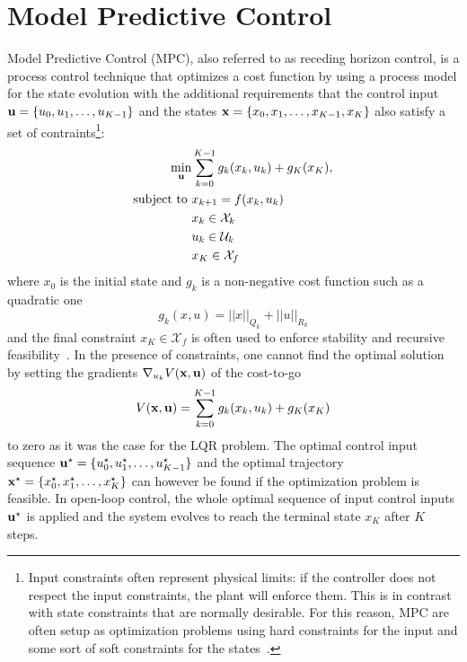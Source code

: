 \chapter{Model Predictive Control}
\label{sec:MPC}

Model Predictive Control (MPC), also referred to as receding horizon control, is a process control technique that optimizes a cost function by using a process model for the state evolution with the additional requirements that the control input $\boldsymbol{\mathrm{u}} = \{u_0,u_1,\ldots,u_{K-1}\}$ and the states $\boldsymbol{\mathrm{x}} = \{x_0,x_1,\ldots,x_{K-1},x_K\}$ also satisfy a set of contraints\footnote{Input constraints often represent physical limits: if the controller does not respect the input constraints, the plant will enforce them. This is in contrast with state constraints that are normally desirable. For this reason, MPC are often setup as optimization problems using hard constraints for the input and some sort of soft constraints for the states~\cite{MPC-diehl}.}:
\begin{equation}
  \label{eq:MPC-general-formulation}
  \begin{aligned}
    \min_{\boldsymbol{\mathrm{u}}} &\sum_{k=0}^{K-1} g_k(x_k,u_k) + g_K(x_K),\\
    \text{subject to } & x_{k+1} = f(x_k,u_k) \\
                & x_k \in \mathcal{X}_k \\
                & u_k \in \mathcal{U}_k \\
                & x_K \in \mathcal{X}_f \\
  \end{aligned}
\end{equation}
where $x_0$ is the initial state and $g_k$ is a non-negative cost function such as a quadratic one
\begin{equation}
  \label{eq:quadratic-stage-cost}
  g_k(x,u) = ||x||_{Q_k} + ||u||_{R_k} %
\end{equation}
and the final constraint $x_K \in \mathcal{X}_f$ is often used to enforce stability and recursive feasibility~\cite[Sec.~2.1]{ENMPC-faulwasser}.
In the presence of constraints, one cannot find the optimal solution by setting the gradients $\nabla_{u_k} V(\boldsymbol{\mathrm{x}},\boldsymbol{\mathrm{u}})$ of the cost-to-go
\begin{equation}
  \label{eq:cost-to-go}
  V(\boldsymbol{\mathrm{x}},\boldsymbol{\mathrm{u}}) = \sum_{k=0}^{K-1} g_k(x_k,u_k) + g_K(x_K)
\end{equation}
to zero as it was the case for the LQR problem. The optimal control input sequence $\boldsymbol{\mathrm{u}}^\star = \{u_0^\star,u_1^\star,\ldots,u_{K-1}^\star\}$ and the optimal trajectory $\boldsymbol{\mathrm{x}}^\star = \{x_0^\star,x_1^\star,\ldots,x_K^\star\}$ can however be found if the optimization problem is feasible. In open-loop control, the whole optimal sequence of input control inputs $\boldsymbol{\mathrm{u}}^\star$ is applied and the system evolves to reach the terminal state $x_K$ after $K$ steps.

